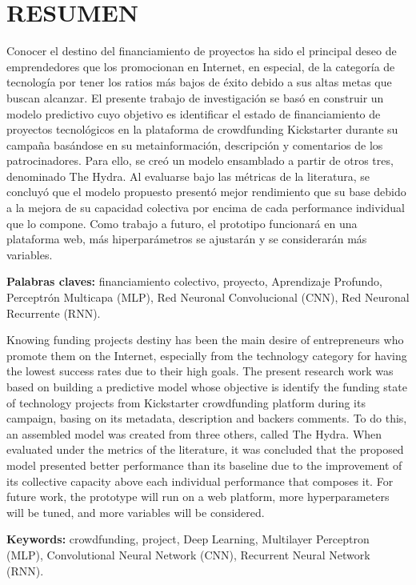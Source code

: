 
\chapter*{RESUMEN}

Conocer el destino del financiamiento de proyectos ha sido el principal deseo de emprendedores que los promocionan en Internet, en especial, de la categoría de tecnología por tener los ratios más bajos de éxito debido a sus altas metas que buscan alcanzar. El presente trabajo de investigación se basó en construir un modelo predictivo cuyo objetivo es identificar el estado de financiamiento de proyectos tecnológicos en la plataforma de crowdfunding Kickstarter durante su campaña basándose en su metainformación, descripción y comentarios de los patrocinadores. Para ello, se creó un modelo ensamblado a partir de otros tres, denominado The Hydra. Al evaluarse bajo las métricas de la literatura, se concluyó que el modelo propuesto presentó mejor rendimiento que su base debido a la mejora de su capacidad colectiva por encima de cada performance individual que lo compone. Como trabajo a futuro, el prototipo funcionará en una plataforma web, más hiperparámetros se ajustarán y se considerarán más variables.

\textbf{Palabras claves: } financiamiento colectivo, proyecto, Aprendizaje Profundo, Perceptrón Multicapa (MLP), Red Neuronal Convolucional (CNN), Red Neuronal Recurrente (RNN).

\vspace{0.5cm}
Knowing funding projects destiny has been the main desire of entrepreneurs who promote them on the Internet, especially from the technology category for having the lowest success rates due to their high goals. The present research work was based on building a predictive model whose objective is identify the funding state of technology projects from Kickstarter crowdfunding platform during its campaign, basing on its metadata, description and backers comments. To do this, an assembled model was created from three others, called The Hydra. When evaluated under the metrics of the literature, it was concluded that the proposed model presented better performance than its baseline due to the improvement of its collective capacity above each individual performance that composes it. For future work, the prototype will run on a web platform, more hyperparameters will be tuned, and more variables will be considered.

\textbf{Keywords: } crowdfunding, project, Deep Learning, Multilayer Perceptron (MLP), Convolutional Neural Network (CNN), Recurrent Neural Network (RNN).